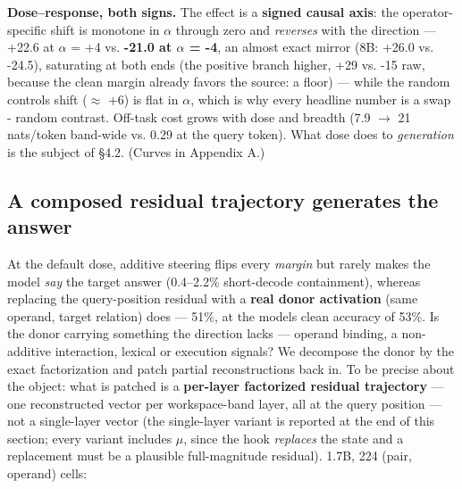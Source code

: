\textbf{Dose--response, both signs.} The effect is a \textbf{signed
causal axis}: the operator-specific shift is monotone in \ensuremath{\alpha} through zero
and \emph{reverses} with the direction --- +22.6 at \ensuremath{\alpha} = +4 vs.
\textbf{-21.0 at \ensuremath{\alpha} = -4}, an almost exact mirror (8B: +26.0 vs. -24.5),
saturating at both ends (the positive branch higher, +29 vs. -15 raw,
because the clean margin already favors the source: a floor) --- while
the random control\textquotesingle s shift (\ensuremath{\approx} +6) is flat in
\textbar \ensuremath{\alpha}\textbar, which is why every headline number is a swap -
random contrast. Off-task cost grows with dose and breadth (7.9 \ensuremath{\to} 21
nats/token band-wide vs. 0.29 at the query token). What dose does to
\emph{generation} is the subject of \S{}4.2. (Curves in Appendix A.)

\subsection{A composed residual trajectory generates the
answer}

At the default dose, additive steering flips every \emph{margin} but
rarely makes the model \emph{say} the target answer (0.4--2.2\%
short-decode containment), whereas replacing the query-position residual
with a \textbf{real donor activation} (same operand, target relation)
does --- 51\%, at the model\textquotesingle s clean accuracy of 53\%. Is
the donor carrying something the direction lacks --- operand binding, a
non-additive interaction, lexical or execution signals? We decompose the
donor by the exact factorization and patch partial reconstructions back
in. To be precise about the object: what is patched is a
\textbf{per-layer factorized residual trajectory} --- one reconstructed
vector per workspace-band layer, all at the query position --- not a
single-layer vector (the single-layer variant is reported at the end of
this section; every variant includes \ensuremath{\mu}, since the hook \emph{replaces}
the state and a replacement must be a plausible full-magnitude
residual). 1.7B, 224 (pair, operand) cells:

